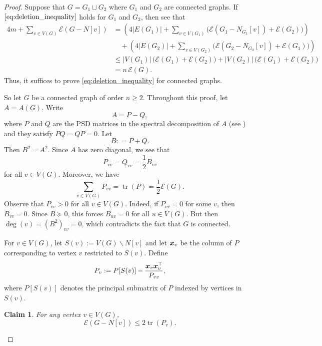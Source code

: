 \documentclass[11pt]{article}
\theoremstyle{plain}
\newtheorem{claim}{Claim}[section]
\numberwithin{equation}{section}
\DeclareMathOperator{\tr}{tr}
\def\x{\mbox{\boldmath $x$}}
\begin{document}
\begin{proof} Suppose that $G = G_1 \sqcup G_2$ where $G_1$ and $G_2$ are connected graphs. If $\eqref{eq:deletion_inequality}$ holds for $G_1$ and $G_2$, then see that 
\begin{align*}
4m + \sum_{v\in V(G)}\mathcal{E}(G-N[v]) & =  \left(4|E(G_1)|+\sum_{v\in V(G_1)}\bigl(\mathcal{E}(G_1-N_{G_1}[v]) + \mathcal{E}(G_2)\bigr)\right) \\
& \quad + \left(4|E(G_2)|  + \sum_{v\in V(G_2)}\bigl(\mathcal{E}(G_2-N_{G_2}[v]) + \mathcal{E}(G_1)\bigr)\right)\\
& \le |V(G_1)|\, \bigl(\mathcal{E}(G_1) + \mathcal{E}(G_2)\bigr)  + |V(G_2)|\,\bigl(\mathcal{E}(G_1) + \mathcal{E}(G_2)\bigr) \\
& = n\,\mathcal{E}(G).
\end{align*}
Thus, it suffices to prove \eqref{eq:deletion_inequality} for connected graphs.

So let $G$ be a connected graph of order $n\ge 2$. Throughout this proof, let $A= A(G)$. Write 
\[ A = P - Q,\]
where $P$ and $Q$ are the PSD matrices in the spectral decomposition of $A$ (see \cite[Theorem 4.1.5]{Horn_Johnson_2013}) and they satisfy $PQ = QP = 0$. Let 
\[ B: = P + Q.\]
Then $B^2 = A^2$. Since $A$ has zero diagonal, we see that
\begin{equation}\label{eq:B_entry}
    P_{vv} = Q_{vv} = \frac{1}{2}B_{vv}
\end{equation}
for all $v\in V(G)$. Moreover, we have 
\begin{equation}\label{eq:trace_P_energy}
    \sum_{v\in V(G)} P_{vv} = \tr(P) = \frac{1}{2}\mathcal{E}(G).
\end{equation}
Observe that $P_{vv} > 0$ for all $v\in V(G)$. Indeed, if $P_{vv} = 0$ for some $v$, then $B_{vv} = 0$. Since $B\succeq 0$, this forces $B_{uv} = 0$ for all $u\in V(G)$. But then $\deg(v) = (B^2)_{vv} = 0$, which contradicts the fact that $G$ is connected.

For $v\in V(G)$, let $S(v):=V(G)\backslash N[v]$ and let $\x_v$ be the column of $P$ corresponding to vertex $v$ restricted to $S(v)$. Define 
\[P_{v}:= P[S(v)] - \frac{\x_v\x_v^\top}{P_{vv}},\]
where $P[S(v)]$ denotes the principal submatrix of $P$ indexed by vertices in $S(v)$. 

\begin{claim}\label{claim:vertex_deleted_trace} For any vertex $v\in V(G)$,
   \[\mathcal{E}(G-N[v])\le 2\tr(P_v).\] 
\end{claim}


\end{proof}
\end{document}
